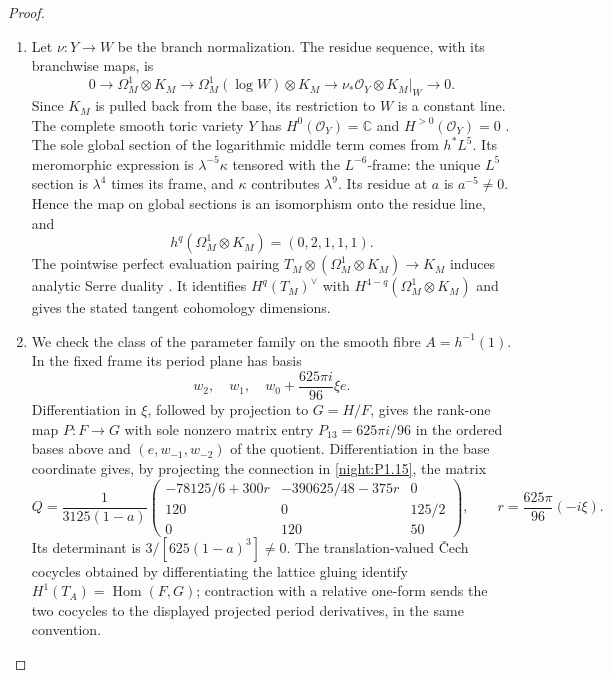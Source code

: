 \begin{proof}
\begin{enumerate}[label={$\langle1\rangle$\arabic*.}]
\item Let $\nu:Y\to W$ be the branch normalization.  The residue
sequence, with its branchwise maps, is
\[
0\longrightarrow\Omega^1_M\otimes K_M
\longrightarrow\Omega^1_M(\log W)\otimes K_M
\longrightarrow\nu_*\mathcal O_Y\otimes K_M|_W
\longrightarrow0.
\]
Since $K_M$ is pulled back from the base, its restriction to $W$ is
a constant line.  The complete smooth toric variety $Y$ has
$H^0(\mathcal O_Y)=\mathbb C$ and $H^{>0}(\mathcal O_Y)=0$
\cite[Theorem~9.2.3, p.~410, with divisor zero]{CoxLittleSchenck2011}.
The sole global section of the logarithmic middle term comes from
$h^*L^5$.  Its meromorphic expression is
$\lambda^{-5}\kappa$ tensored with the $L^{-6}$-frame: the
unique $L^5$ section is $\lambda^4$ times its frame, and
$\kappa$ contributes $\lambda^9$.  Its residue at $a$ is
$a^{-5}\ne0$.  Hence the map on global sections is an isomorphism
onto the residue line, and
\[
h^q(\Omega^1_M\otimes K_M)=(0,2,1,1,1).
\]
The pointwise perfect evaluation pairing
$T_M\otimes(\Omega^1_M\otimes K_M)\to K_M$ induces analytic
Serre duality
\cite[\S13, Theorem~4, p.~22; \S15, p.~23]{Serre1955Duality}.
It identifies $H^q(T_M)^\vee$ with
$H^{4-q}(\Omega^1_M\otimes K_M)$ and gives the stated tangent
cohomology dimensions.

\item We check the class of the parameter family on the
smooth fibre $A=h^{-1}(1)$.  In the fixed frame its period plane
has basis
\[
w_2,\quad w_1,\quad w_0+\frac{625\pi i}{96}\xi e.
\]
Differentiation in $\xi$, followed by projection to $G=H/F$,
gives the rank-one map $P:F\to G$ with sole nonzero matrix entry
$P_{13}=625\pi i/96$ in the ordered bases above and
$(e,w_{-1},w_{-2})$ of the quotient.
Differentiation in the base coordinate gives, by projecting the
connection in \cref{night:P1.15}, the matrix
\[
Q=\frac1{3125(1-a)}
\begin{pmatrix}
-78125/6+300r&-390625/48-375r&0\\
120&0&125/2\\
0&120&50
\end{pmatrix},
\qquad r=\frac{625\pi}{96}(-i\xi).
\]
Its determinant is $3/[625(1-a)^3]\ne0$.
The translation-valued \v Cech cocycles obtained by differentiating
the lattice gluing identify
$H^1(T_A)=\operatorname{Hom}(F,G)$; contraction with a relative
one-form sends the two cocycles to the displayed projected period
derivatives, in the same convention.


\end{enumerate}
\end{proof}
